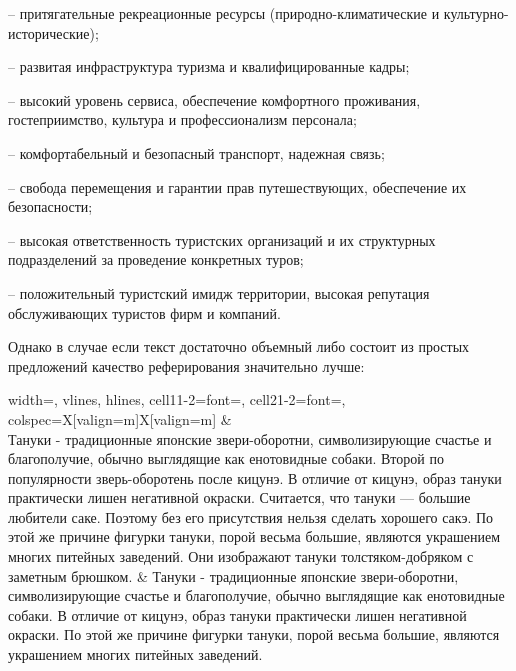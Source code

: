 \documentclass[12pt, a4paper]{article}
\begin{document}
\begin{results}
\begin{center}
\begin{tblr}
        – притягательные рекреационные ресурсы (природно-климатические и культурно-исторические); 

        – развитая инфраструктура туризма и квалифицированные кадры; 

        – высокий уровень сервиса, обеспечение комфортного проживания, гостеприимство, культура и профессионализм персонала; 

        – комфортабельный и безопасный транспорт, надежная связь; 

        – свобода перемещения и гарантии прав путешествующих, обеспечение их безопасности; 

        – высокая ответственность туристских организаций и их структурных подразделений за проведение конкретных туров; 

        – положительный туристский имидж территории, высокая репутация обслуживающих туристов фирм и компаний.\\
        \end{tblr}
    \end{center}

    Однако в случае если текст достаточно объемный либо состоит из простых предложений качество реферирования значительно лучше:
        
    \begin{center}
        \begin{tblr}{ 
                width=\linewidth,
                vlines, hlines,
                cell{1}{1-2}={font=\fontsize{9pt}{12pt}\selectfont},
                cell{2}{1-2}={font=\itshape\fontsize{9pt}{12pt}\selectfont},
                colspec={X[valign=m]X[valign=m]} 
        } 
         & \\
            Тануки - традиционные японские звери-оборотни, символизирующие счастье и благополучие, обычно выглядящие как енотовидные собаки. Второй по популярности зверь-оборотень после кицунэ. В отличие от кицунэ, образ тануки практически лишен негативной окраски. Считается, что тануки — большие любители саке. Поэтому без его присутствия нельзя сделать хорошего сакэ. По этой же причине фигурки тануки, порой весьма большие, являются украшением многих питейных заведений. Они изображают тануки толстяком-добряком с заметным брюшком. & Тануки - традиционные японские звери-оборотни, символизирующие счастье и благополучие, обычно выглядящие как енотовидные собаки. В отличие от кицунэ, образ тануки практически лишен негативной окраски. По этой же причине фигурки тануки, порой весьма большие, являются украшением многих питейных заведений.\\
        \end{tblr}
    \end{center}


\end{results}
\end{document}
